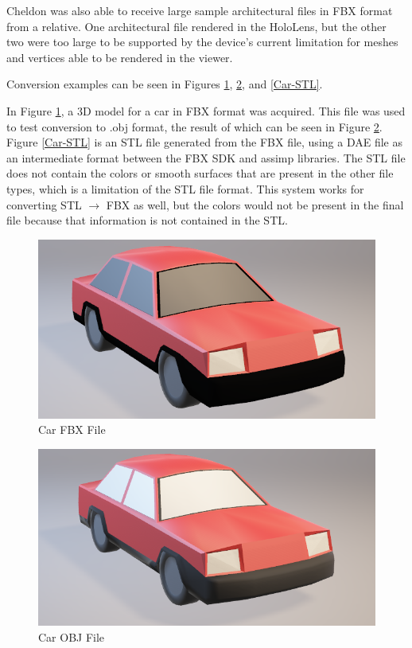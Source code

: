     Cheldon was also able to receive large sample architectural files in FBX format from a relative. One architectural file rendered in the HoloLens, but the other two were too large to be supported by the device's current limitation for meshes and vertices able to be rendered in the viewer.

    Conversion examples can be seen in Figures \ref{Car-FBX}, \ref{Car-OBJ}, and \ref{Car-STL}.  
    
    In Figure \ref{Car-FBX}, a 3D model for a car in FBX format was acquired. This file was used to test conversion to .obj format, the result of which can be seen in Figure \ref{Car-OBJ}. Figure \ref{Car-STL} is an STL file generated from the FBX file, using a DAE file as an intermediate format between the FBX SDK and assimp libraries. The STL file does not contain the colors or smooth surfaces that are present in the other file types, which is a limitation of the STL file format. This system works for converting STL $\rightarrow$ FBX as well, but the colors would not be present in the final file because that information is not contained in the STL. 
    
\begin{figure}[H]
    \centering
    \includegraphics[width=\textwidth]{Car-FBX.png}
    \caption{Car FBX File}
    \label{Car-FBX}
\end{figure}

\begin{figure}[H]
    \centering
    \includegraphics[width=\textwidth]{Car-OBJ.png}
    \caption{Car OBJ File}
    \label{Car-OBJ}
\end{figure}

